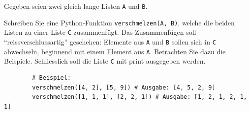 \begin{myexercise}
	Gegeben seien zwei gleich lange Listen \texttt{A} und \texttt{B}.

	Schreiben Sie eine Python-Funktion \lstinline|verschmelzen(A, B)|, welche die beiden Listen zu einer Liste \texttt{C} zusammenfügt. Das Zusammenfügen soll \enquote{reissverschlussartig} geschehen: Elemente aus \texttt{A} und \texttt{B} sollen sich in \texttt{C} abwechseln, beginnend mit einem Element aus \texttt{A}. Betrachten Sie dazu die Beispiele. Schliesslich soll die Liste \texttt{C} mit print ausgegeben werden.

	\begin{lstlisting}
		# Beispiel:
		verschmelzen([4, 2], [5, 9]) # Ausgabe: [4, 5, 2, 9]
		verschmelzen([1, 1, 1], [2, 2, 1]) # Ausgabe: [1, 2, 1, 2, 1, 1]
	\end{lstlisting}

	\begin{myanswer}
		
	\end{myanswer}
\end{myexercise}

